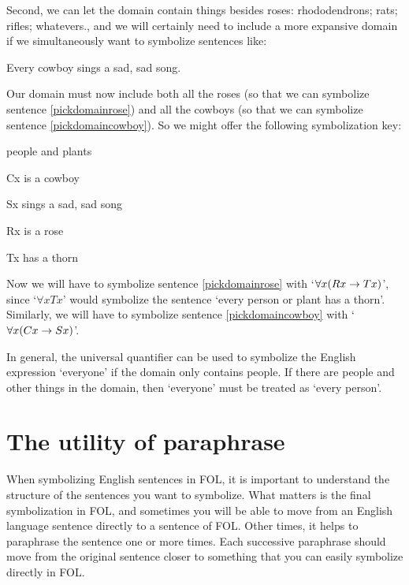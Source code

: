 Second, we can let the domain contain things besides roses: rhododendrons; rats; rifles; whatevers., and we will certainly need to include a more expansive domain if we simultaneously want to symbolize sentences like:
	\begin{earg}
		\item[\ex{pickdomaincowboy}] Every cowboy sings a sad, sad song.
	\end{earg}
Our domain must now include both all the roses (so that we can symbolize sentence \ref{pickdomainrose}) and all the cowboys (so that we can symbolize sentence \ref{pickdomaincowboy}). So we might offer the following symbolization key:
	\begin{ekey}
		\item[\text{domain}] people and plants
		\item[Cx]  is a cowboy
		\item[Sx]  sings a sad, sad song
		\item[Rx]  is a rose
		\item[Tx]  has a thorn
	\end{ekey}
Now we will have to symbolize sentence \ref{pickdomainrose} with `$\forall x (Rx \rightarrow Tx)$', since `$\forall x Tx$' would symbolize the sentence `every person or plant has a thorn'. Similarly, we will have to symbolize sentence \ref{pickdomaincowboy} with `$\forall x (Cx \rightarrow Sx)$'. 

In general, the universal quantifier can be used to symbolize the English expression `everyone' if the domain only contains people. If there are people and other things in the domain, then `everyone' must be treated as `every person'.


\section{The utility of paraphrase}
When symbolizing English sentences in FOL, it is important to understand the structure of the sentences you want to symbolize. What matters is the final symbolization in FOL, and sometimes you will be able to move from an English language sentence directly to a sentence of FOL. Other times, it helps to paraphrase the sentence one or more times. Each successive paraphrase should move from the original sentence closer to something that you can easily symbolize directly in FOL.

